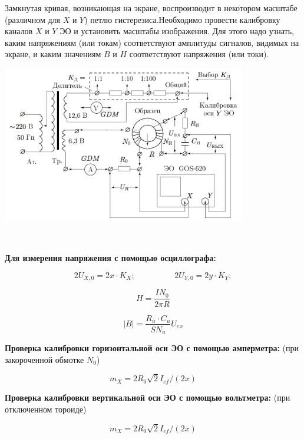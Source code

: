 \documentclass[a4paper,12pt]{article}
\begin{document}
Замкнутая кривая, возникающая на экране, воспроизводит в некотором масштабе (различном для $X$ и $Y$) петлю гистерезиса.Необходимо провести калибровку каналов $X$ и $Y$ ЭО и установить масштабы изображения. Для этого надо узнать, каким напряжениям (или токам) соответствуют амплитуды сигналов, видимых на экране, и каким значениям $B$ и $H$ соответствуют напряжения (или токи).
\begin{center}
	\includegraphics[width = 0.8\textwidth]{345-1.png}
\end{center}\

\textbf{Для измерения напряжения с помощью осциллографа:}

\begin{equation}\label{}
    2U_{X,0}=2x\cdot K_X; \hspace{2cm} 2U_{Y,0}=2y\cdot K_Y;
\end{equation}

\begin{equation}\label{}
    H=\frac{IN_0}{2\pi R}
\end{equation}

\begin{equation}\label{}
    |B|=\frac{R_u \cdot C_u}{SN_u}U_{ex}
\end{equation}


\textbf{Проверка калибровки горизонтальной оси ЭО с помощью амперметра:} (при закороченной обмотке $N_0$) 


\begin{equation}\label{}
    m_X=2R_0\sqrt{2}I_{ef}/(2x) 
\end{equation}

\textbf{Проверка калибровки вертикальной оси ЭО с помощью вольтметра:} (при отключенном тороиде)


\begin{equation}\label{}
    m_X=2R_0\sqrt{2}I_{ef}/(2x) 
\end{equation}
\end{document}

